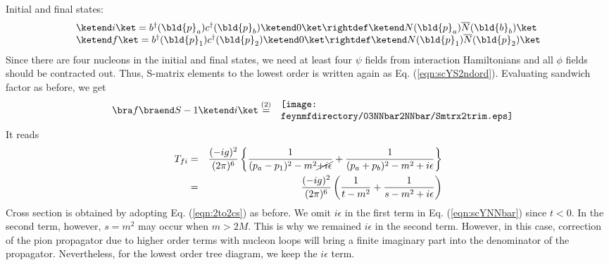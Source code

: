 \bigskip

Initial and final states:
\begin{eqnarray}
\begin{array}{l}
\ketend i \ket
=
b^\dagger(\bld{p}_a) c^\dagger(\bld{p}_b) \ketend 0 \ket
\rightdef
\ketend N(\bld{p}_a) \overline{N}(\bld{b}_b )\ket
\\
\ketend f \ket
=
b^\dagger(\bld{p}_1) c^\dagger(\bld{p}_2) \ketend 0 \ket
\rightdef
\ketend N(\bld{p}_1) \overline{N}(\bld{p}_2) \ket
\end{array}
\label{eqn:scYNNbarNNbarinit}
\end{eqnarray}
Since there are four nucleons in the initial and final states, we need at least 
four $\psi$ fields from interaction Hamiltonians and all $\phi$ fields should
be contracted out. Thus, S-matrix elements to the lowest order is written 
again as Eq. (\ref{eqn:scYS2ndord}). Evaluating sandwich factor as before,
we get
\begin{eqnarray}
\bra f \braend S - 1 \ketend i \ket
&\stackrel{(2)}{=}&
\parbox{80mm}{
\texttt{[image: \\feynmfdirectory/03NNbar2NNbar/Smtrx2trim.eps]}
}
\nonumber\\
\label{eqn:scYSmtrxFeynmDiagNNbar}
\end{eqnarray}
It reads
\begin{eqnarray}
T_{fi}
&=&
\frac{(-i g)^2}{(2\pi)^6} 
\left\{
\frac{1}{(p_a - p_1)^2 - m^2 \cancel{+ i\epsilon}}
+
\frac{1}{(p_a + p_b)^2 - m^2 + i\epsilon}
\right\}
\nonumber\\
&=&
\frac{(-i g)^2}{(2\pi)^6} 
\left(
\frac{1}{t - m^2}
+
\frac{1}{s - m^2 + i\epsilon}
\right)
\label{eqn:scYNNbar}
\end{eqnarray}
Cross section is obtained by adopting Eq. (\ref{eqn:2to2cs}) as before.
We omit $i \epsilon$ in the first term in Eq. (\ref{eqn:scYNNbar}) since
$t < 0$. In the second term, however, $s = m^2$ may occur when
$m > 2M$. This is why we remained $i \epsilon$ in the second term.
However, in this case, correction of the pion propagator due to higher
order terms with nucleon loops will bring a finite imaginary part into the
denominator of the propagator. Nevertheless, for the lowest order
tree diagram, we keep the $i \epsilon$ term.

\bigskip

